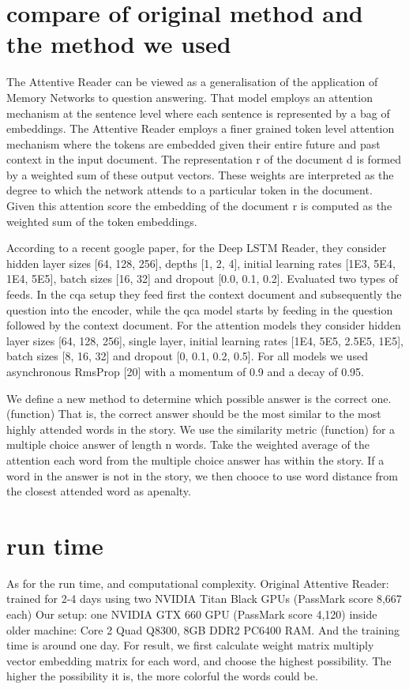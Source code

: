 \documentclass[runningheads,a4paper]{llncs}
\begin{document}
\section{compare of original method and the method we used}
The Attentive Reader can be viewed as a generalisation of the application of Memory Networks to question answering. That model employs an attention mechanism at the sentence level where each sentence is represented by a bag of embeddings. The Attentive Reader employs a finer grained token level attention mechanism where the tokens are embedded given their entire future and past context in the input document. 
The representation r of the document d is formed by a weighted sum of these output vectors. These weights are interpreted as the degree to which the network attends to a particular token in the document. Given this attention score the embedding of the document r is computed as the weighted sum of the token embeddings. 

According to a recent google paper, for the Deep LSTM Reader, they consider hidden layer sizes [64, 128, 256], depths [1, 2, 4], initial learning rates [1E3, 5E4, 1E4, 5E5], batch sizes [16, 32] and dropout [0.0, 0.1, 0.2]. Evaluated two types of feeds. In the cqa setup they feed first the context document and subsequently the question into the encoder, while the qca model starts by feeding in the question followed by the context document. For the attention models they consider hidden layer sizes [64, 128, 256], single layer, initial learning rates [1E4, 5E5, 2.5E5, 1E5], batch sizes [8, 16, 32] and dropout [0, 0.1, 0.2, 0.5]. For all models we used asynchronous RmsProp [20] with a momentum of 0.9 and a decay of 0.95. 


We define a new method to determine which possible answer is the correct one. (function) That is, the correct answer should be the most similar to the most highly attended words in the story. We use the similarity metric (function) for a multiple choice answer of length n words. Take the weighted average of the attention each word from the multiple choice answer has within the story. If a word in the answer is not in the story, we then chooce to use word distance from the closest attended word as apenalty.


\section{run time}
As for the run time, and computational complexity. Original Attentive Reader: trained for 2-4 days using two NVIDIA Titan Black GPUs (PassMark score 8,667 each)
Our setup: one NVIDIA GTX 660 GPU (PassMark score 4,120) inside older machine: Core 2 Quad Q8300, 8GB DDR2 PC6400 RAM. And the training time is around one day.
For result, we first calculate weight matrix multiply vector embedding matrix for each word, and choose the highest possibility. The higher the possibility it is, the more colorful the words could be.
\end{document}
